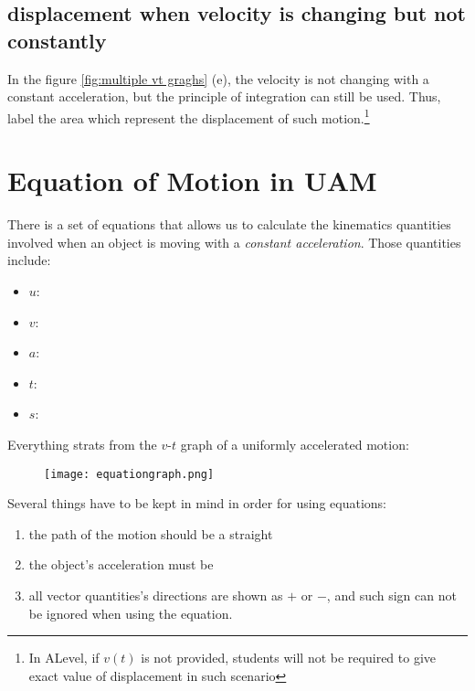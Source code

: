 \documentclass[a4paper]{tufte-handout}
\newenvironment{SummBox}
{\begin{tcolorbox}[breakable,colback=r1!30,colframe=r1,title=Summary]} {\end{tcolorbox}}
\begin{document}
\subsection{displacement when velocity is changing but not constantly}
In the figure \ref{fig:multiple vt graghs} (e), the velocity is not changing with a constant acceleration, but the principle of integration can still be used. Thus, label the area which represent the displacement of such motion.\footnote{In ALevel, if $v(t)$ is not provided, students will not be required to give exact value of displacement in such scenario}

\begin{SummBox}

\end{SummBox}

\section{Equation of Motion in UAM}
There is a set of equations that allows us to calculate the kinematics quantities involved when an object is moving with a \emph{constant acceleration}. Those quantities include:
\begin{itemize}
  \item $u$:\uline{\hfill}
  \item $v$:\uline{\hfill}
  \item $a$:\uline{\hfill}
  \item $t$:\uline{\hfill}
  \item $s$:\uline{\hfill}
\end{itemize}

Everything strats from the $v$-$t$ graph of a uniformly accelerated motion:
\begin{figure}[ht]
\texttt{[image: equationgraph.png]}
\end{figure}
Several things have to be kept in mind in order for using equations:
\begin{enumerate}
  \item the path of the motion should be a straight \uline{\hspace{0.5in}}
  \item the object's  acceleration must be \uline{\hspace{0.5in}}
  \item all vector quantities's directions are shown as $+$ or $-$, and such sign can not be ignored when using the equation.
\end{enumerate}
\end{document}

